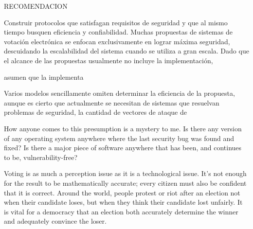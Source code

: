 \makeatletter
\def\@makechapterhead#1{%
  {\parindent \z@ \raggedright \normalfont
    \interlinepenalty\@M
    \Huge\bfseries  \thechapter.\quad #1\par\nobreak
    \vskip 22\p@
    \clearpage
  }}
\makeatother


RECOMENDACION
	
	\item Construir protocolos que satisfagan requisitos de seguridad y que al mismo tiempo busquen eficiencia y 
		confiabilidad. Muchas propuestas de sistemas de votación electrónica se enfocan exclusivamente en lograr
		máxima seguridad, descuidando la escalabilidad del sistema cuando se utiliza a gran escala. Dado que el 
		alcance de las propuestas usualmente no incluye la implementación, 
		

		
		asumen que la implementa
		
		
		Varios modelos
		sencillamente omiten determinar la eficiencia de la propuesta, aunque es cierto que actualmente se necesitan
		de sistemas que resuelvan problemas de seguridad, la cantidad de vectores de ataque de 
		
		
		How anyone comes to this presumption is a mystery to me. Is there any version of any operating system 
		anywhere where the last security bug was found and fixed? Is there a major piece of software 
		anywhere that has been, and continues to be, vulnerability-free?
		
		Voting is as much a perception issue as it is a technological issue. It's not enough for the result to be
		mathematically accurate; every citizen must also be confident that it is correct. Around the world, 
		people protest or riot after an election not when their candidate loses, but when they think their candidate 
		lost unfairly. It is vital for a democracy that an election both accurately determine 
		the winner and adequately convince the loser.


\begin{comment}











\end{comment}





